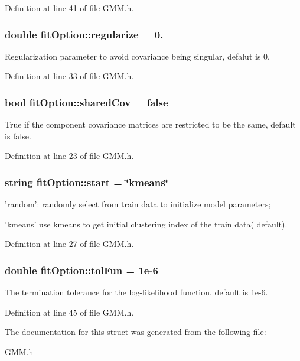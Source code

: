 Definition at line 41 of file G\+M\+M.\+h.

\hypertarget{structfit_option_abffa02537679becf07413b31f5889e6f}{
\subsubsection[{regularize}]{\setlength{\rightskip}{0pt plus 5cm}double fit\+Option\+::regularize = 0.}}\label{structfit_option_abffa02537679becf07413b31f5889e6f}
Regularization parameter to avoid covariance being singular, defalut is 0. 

Definition at line 33 of file G\+M\+M.\+h.

\hypertarget{structfit_option_a2efaf3629539e3864967853058e80420}{
\subsubsection[{shared\+Cov}]{\setlength{\rightskip}{0pt plus 5cm}bool fit\+Option\+::shared\+Cov = false}}\label{structfit_option_a2efaf3629539e3864967853058e80420}
True if the component covariance matrices are restricted to be the same, default is false. 

Definition at line 23 of file G\+M\+M.\+h.

\hypertarget{structfit_option_a4c1ecd5ba984e2e12faa29217c78f931}{
\subsubsection[{start}]{\setlength{\rightskip}{0pt plus 5cm}string fit\+Option\+::start = \char`\"{}kmeans\char`\"{}}}\label{structfit_option_a4c1ecd5ba984e2e12faa29217c78f931}
'random'\+: randomly select from train data to initialize model parameters;

'kmeans' use kmeans to get initial clustering index of the train data( default). 

Definition at line 27 of file G\+M\+M.\+h.

\hypertarget{structfit_option_a4523efadc5bc4f29cd1648ac4ca018dd}{
\subsubsection[{tol\+Fun}]{\setlength{\rightskip}{0pt plus 5cm}double fit\+Option\+::tol\+Fun = 1e-\/6}}\label{structfit_option_a4523efadc5bc4f29cd1648ac4ca018dd}
The termination tolerance for the log-\/likelihood function, default is 1e-\/6. 

Definition at line 45 of file G\+M\+M.\+h.



The documentation for this struct was generated from the following file\+:\begin{DoxyCompactItemize}
\item 
\hyperlink{_g_m_m_8h}{G\+M\+M.\+h}\end{DoxyCompactItemize}
